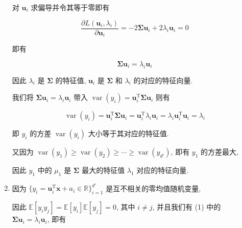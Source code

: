 \documentclass[answers]{exam}  %
\begin{document}
\begin{questions}
\begin{solution}
\begin{enumerate}
            对 $\bm{u}_i$ 求偏导并令其等于零即有

            $$
              \frac{\partial L(\bm{u}_i, \lambda_i)}{\partial \bm{u}_i} = -2\bm{\Sigma} \bm{u}_i + 2\lambda_i \bm{u}_i = 0
            $$

            即有

            $$
              \bm{\Sigma} \bm{u}_i = \lambda_i \bm{u}_i
            $$

            因此 $\lambda_i$ 是 $\bm{\Sigma}$ 的特征值, $\bm{u}_i$ 是 $\bm{\Sigma}$ 和 $\lambda_i$ 的对应的特征向量.

            我们将 $\bm{\Sigma} \bm{u}_i = \lambda_i \bm{u}_i$ 带入 $\operatorname{var}(y_i) = \bm{u}_i^{\mathrm{T}}\bm{\Sigma}\bm{u}_i$ 则有

            $$
              \operatorname{var}(y_i) = \bm{u}_i^{\mathrm{T}}\bm{\Sigma}\bm{u}_i = \bm{u}_i^{\mathrm{T}}\lambda_i\bm{u}_i = \lambda_i\bm{u}_i^{\mathrm{T}}\bm{u}_i = \lambda_i
            $$

            即 $y_i$ 的方差 $\operatorname{var}(y_i)$ 大小等于其对应的特征值.

            又因为 $\operatorname{var}(y_1) \ge \operatorname{var}(y_2) \ge \cdots \ge \operatorname{var}(y_{d'})$, 即有 $y_1$ 的方差最大,

            因此 $y_1$ 中的 $\mu_1$ 是 $\bm{\Sigma}$ 最大的特征值 $\lambda_1$ 对应的特征向量.

      \item

            因为 $\{ y_i = \bm{u}_i^{\mathrm{T}}\bm{x} + a_i \in \mathbb{R} \}_{i=1}^{d'}$ 是互不相关的零均值随机变量,

            因此 $\mathbb{E}[y_i y_j] = \mathbb{E}[y_i]\mathbb{E}[y_j] = 0$, 其中 $i \neq j$, 并且我们有 (1) 中的 $\bm{\Sigma} \bm{u}_i = \lambda_i \bm{u}_i$, 即有


\end{enumerate}
\end{solution}
\end{questions}
\end{document}
